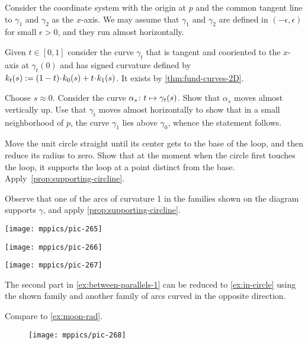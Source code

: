 \begin{multicols}{2}
Consider the coordinate system with the origin at $p$ and the common tangent line to $\gamma_1$ and $\gamma_2$ as the $x$-axis.
We may assume that $\gamma_1$ and $\gamma_2$ are defined in $(-\epsilon,\epsilon)$ for small $\epsilon>0$,
and they run almost horizontally.

Given $t\in[0,1]$ consider the curve $\gamma_t$ that is tangent and cooriented to the $x$-axis at $\gamma_t(0)$ and has signed curvature defined by $\skur_t(s)\z\df(1\z-t)\cdot\skur_0(s)+t\cdot\skur_1(s)$.
It exists by \ref{thm:fund-curves-2D}.

Choose $s\approx 0$.
Consider the curve $\alpha_s\:t\z\mapsto \gamma_t(s)$.
Show that $\alpha_s$ moves almost vertically up.
Use that $\gamma_t$ moves almost horizontally to show that in a small neighborhood of $p$, the curve $\gamma_1$ lies above $\gamma_0$,
whence the statement follows.

Move the unit circle straight until its center gets to the base of the loop,
and then reduce its radius to zero.
Show that at the moment when the circle first touches the loop, it supports the loop at a point distinct from the base.
Apply~\ref{prop:supporting-circline}.


Observe that one of the arcs of curvature 1 in the families shown on the diagram supports $\gamma$, and apply \ref{prop:supporting-circline}.

\begin{Figure}
\begin{minipage}{.35\textwidth}
\centering
\texttt{[image: mppics/pic-265]}
\end{minipage}
\hfill
\begin{minipage}{.3\textwidth}
\centering
\texttt{[image: mppics/pic-266]}
\end{minipage}
\hfill
\begin{minipage}{.25\textwidth}
\centering
\texttt{[image: mppics/pic-267]}
\end{minipage}
\end{Figure}

The second part in \ref{ex:between-parallels-1} can be reduced to \ref{ex:in-circle} using the shown family and another family of arcs curved in the opposite direction.

 Compare to \ref{ex:moon-rad}.

\begin{wrapfigure}{r}{34 mm}
\vskip-6mm
\centering
\texttt{[image: mppics/pic-268]}
\vskip0mm
\end{wrapfigure}


\end{multicols}
